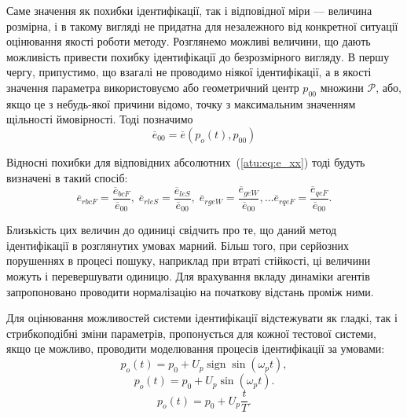 \documentclass[a4paper,13pt]{atuaref}
\DeclareMathOperator*{\sign}{sign}
\begin{document}
Саме значення як похибки ідентифікації, так і відповідної міри ---
величина розмірна, і в такому вигляді не придатна для незалежного від
конкретної ситуації оцінювання якості роботи методу. Розглянемо можливі
величини, що дають можливість привести похибку ідентифікації до безрозмірного
вигляду. В першу чергу, припустимо, що взагалі не проводимо ніякої
ідентифікації, а в якості значення параметра використовуємо або геометричний
центр $p_{00}$ множини $\mathcal{P}$, або, якщо це з небудь-якої причини
відомо, точку з максимальним значенням щільності ймовірності. Тоді позначимо
%
\begin{equation}
  \overline{e}_{00}
  =
  \overline{e}(p_o(t),p_{00})
  \label{atu:eq:e_00}
\end{equation}

Відносні похибки для відповідних абсолютних~(\ref{atu:eq:e_xx})
тоді будуть визначені в такий спосіб:
%
\begin{equation}
  \overline{e}_{rbcF} = \frac{\overline{e}_{bcF}}{\overline{e}_{00}}, \;
  \overline{e}_{rleS} = \frac{\overline{e}_{leS}}{\overline{e}_{00}}, \;
  \overline{e}_{rgeW} = \frac{\overline{e}_{geW}}{\overline{e}_{00}},
  \ldots
  \overline{e}_{rqeF} = \frac{\overline{e}_{qeF}}{\overline{e}_{00}}.
  \label{atu:eq:e_rxx}
\end{equation}

Близькість цих величин до одиниці свідчить про те, що даний метод ідентифікації
в розглянутих умовах марний. Більш того, при серйозних порушеннях в процесі
пошуку, наприклад при втраті стійкості, ці величини можуть і перевершувати
одиницю.
Для врахування вкладу динаміки агентів запропоновано проводити нормалізацію
на початкову відстань проміж ними.


Для оцінювання можливостей системи ідентифікації відстежувати як гладкі, так і
стрибкоподібні зміни параметрів, пропонується для кожної тестової системи, якщо
це можливо, проводити моделювання процесів ідентифікації за умовами:
%
\begin{equation}
  p_o(t) = p_0 +  U_{p} \sign \sin( \omega_{p} t ),
  \label{atu:eq:po_t_sign}
\end{equation}
%
%
\begin{equation}
  p_o(t) = p_0 +  U_{p} \sin( \omega_{p} t ).
  \label{atu:eq:po_t_sin}
\end{equation}
%
\begin{equation}
  p_o(t) = p_0 +  U_{p} \frac{t}{T}.
  \label{atu:eq:po_t_ramp}
\end{equation}
\end{document}
